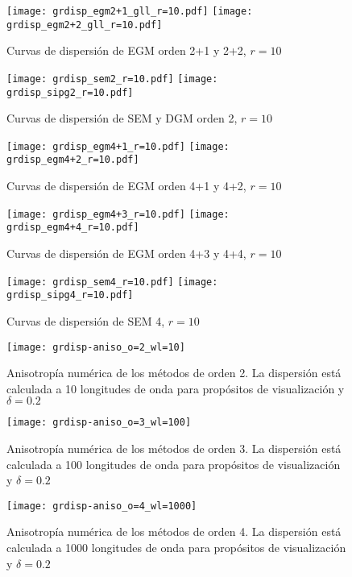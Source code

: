 \documentclass[review,hidelinks,onefignum,onetabnum]{siamart220329}
\newcommand{\tw}{\textwidth}
\begin{document}
\begin{figure}
\texttt{[image: grdisp\_egm2+1\_gll\_r=10.pdf]}
\texttt{[image: grdisp\_egm2+2\_gll\_r=10.pdf]}
\caption{Curvas de dispersi\'on de EGM orden 2+1 y 2+2, $r=10$}
\end{figure} 

\begin{figure}
\texttt{[image: grdisp\_sem2\_r=10.pdf]}
\texttt{[image: grdisp\_sipg2\_r=10.pdf]}
\caption{Curvas de dispersi\'on de SEM y DGM orden 2, $r=10$}
\end{figure} 

\begin{figure}
\texttt{[image: grdisp\_egm4+1\_r=10.pdf]}
\texttt{[image: grdisp\_egm4+2\_r=10.pdf]}
\caption{Curvas de dispersi\'on de EGM orden 4+1 y 4+2, $r=10$}
\end{figure} 

\begin{figure}
\caption{Curvas de dispersi\'on de EGM orden 4+3 y 4+4, $r=10$}
\texttt{[image: grdisp\_egm4+3\_r=10.pdf]}
\texttt{[image: grdisp\_egm4+4\_r=10.pdf]}
\end{figure} 

\begin{figure}
\caption{Curvas de dispersi\'on de SEM 4, $r=10$}
\texttt{[image: grdisp\_sem4\_r=10.pdf]}
\texttt{[image: grdisp\_sipg4\_r=10.pdf]}
\end{figure} 

\begin{figure}
\caption{Anisotrop\'ia num\'erica de los m\'etodos de orden 2. La dispersi\'on est\'a calculada a 10 longitudes de onda para prop\'ositos de visualizaci\'on y $\delta=0.2$}
\texttt{[image: grdisp-aniso\_o=2\_wl=10]}
\end{figure} 

\begin{figure}
\caption{Anisotrop\'ia num\'erica de los m\'etodos de orden 3. La dispersi\'on est\'a calculada a 100 longitudes de onda para prop\'ositos de visualizaci\'on y $\delta=0.2$}
\texttt{[image: grdisp-aniso\_o=3\_wl=100]}
\end{figure} 

\begin{figure}
\caption{Anisotrop\'ia num\'erica de los m\'etodos de orden 4.
La dispersi\'on est\'a calculada a 1000 longitudes de onda para prop\'ositos de visualizaci\'on y $\delta=0.2$}
\texttt{[image: grdisp-aniso\_o=4\_wl=1000]}
\end{figure} 
\end{document}
